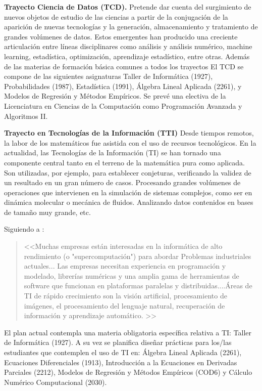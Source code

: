 \documentclass[a4paper, 12pt]{article}
\begin{document}
\begin{description}
\item{\textbf{Trayecto Ciencia de Datos (TCD).}}   Pretende dar cuenta del surgimiento de nuevos objetos de estudio de las ciencias a partir de la conjugación de la aparición de nuevas tecnologías y la generación, almacenamiento y tratamiento de grandes volúmenes de datos. Estos emergentes han producido una creciente articulación entre líneas disciplinares como análisis y análisis numérico, machine learning, estadística, optimización, aprendizaje
estadístico, entre otras. Además de las materias de formación básica comunes a todos los trayectos El TCD se compone de las siguientes asignaturas Taller de Informática (1927), Probabilidades (1987), Estadística (1991), Álgebra Lineal Aplicada (2261),  y Modelos de Regresión y Métodos Empíricos.  Se prevé una electiva  de la Licenciatura en Ciencias de la Computación como Programación Avanzada y Algoritmos II. 




\item{\textbf{Trayecto en Tecnologías de la Información (TTI)}}  Desde tiempos remotos, la labor de los matemáticos fue asistida con el uso de  recursos tecnológicos. En la actualidad,  las Tecnologías de la Información (TI) se han tornado una componente central tanto en el terreno de la matemática pura como aplicada. Son utilizadas, por ejemplo, para establecer conjeturas, verificando la validez de un resultado en un gran número de casos.  Procesando grandes volúmenes de operaciones que intervienen en la simulación de sistemas complejos, como ser en dinámica molecular o mecánica de fluidos. Analizando datos contenidos en bases de tamaño muy grande, etc. 

Siguiendo a \cite{society2012siam}: 
\begin{quote}
<<Muchas empresas están interesadas en la informática de alto rendimiento (o "supercomputación") para abordar 
Problemas industriales actuales... Las empresas necesitan experiencia en programación y modelado, librerías numéricas
 y una amplia gama de herramientas de software que funcionan en plataformas paralelas y distribuidas....Áreas de TI de rápido crecimiento son la visión artificial, procesamiento de imágenes, el procesamiento del lenguaje natural, recuperación de información y aprendizaje automático. >>
\end{quote}

El plan actual contempla una materia obligatoria específica  relativa a TI: Taller de Informática (1927).  A su vez se planifica diseñar prácticas para los/las estudiantes que contemplen el uso de TI en:  Álgebra Lineal Aplicada (2261), Ecuaciones Diferenciales (1913), Introducción a la Ecuaciones en Derivadas Parciales (2212), Modelos de Regresión y Métodos Empíricos (COD6) y Cálculo Numérico Computacional (2030). 



\end{description}
\end{document}
